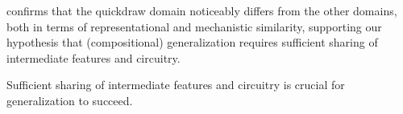  confirms that the quickdraw domain noticeably differs from the other domains, both in terms of representational and mechanistic similarity, supporting our hypothesis that (compositional) generalization requires sufficient sharing of intermediate features and circuitry.
\begin{finding}
    Sufficient sharing of intermediate features and circuitry is crucial for generalization to succeed.
\end{finding}
